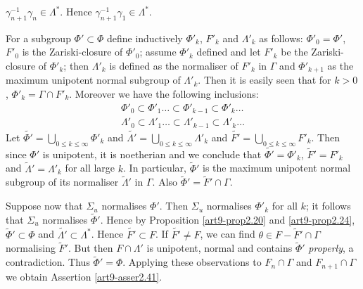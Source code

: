 \setcounter{definition}{40}
\begin{assertion}\label{art9-asser2.41}
$\gamma^{-1}_{n+1} \gamma_n \in \Lambda^\ast$. Hence $\gamma^{-1}_{n+1} \gamma_1 \in \Lambda^\ast$.
\end{assertion}

For a subgroup $\Phi' \subset \Phi$ define inductively $\Phi'_k$, $F'_k$ and $\Lambda'_k$ as follows: $\Phi'_0 = \Phi'$, $F'_0$ is the Zariski-closure of $\Phi'_0$; assume $\Phi'_k$ defined and let $F'_k$ be the Zariski-closure of $\Phi'_k$; then $\Lambda'_k$ is defined as the normaliser of $F'_k$ in $\Gamma$ and $\Phi'_{k+1}$ as the maximum unipotent normal subgroup of $\Lambda'_k$. Then it is easily seen that for $k > 0$, $\Phi'_k = \Gamma \cap F'_k$. Moreover we have the following inclusions:
\begin{align*}
\Phi'_0 \subset \Phi'_1 \ldots \subset \Phi'_{k-1} \subset \Phi'_k\ldots\\
\Lambda'_0 \subset \Lambda'_1 \ldots \subset \Lambda'_{k-1} \subset \Lambda'_k\ldots 
\end{align*}
Let $\tilde{\Phi'} = \bigcup\limits_{0 \leqslant k \leqslant \infty} \Phi'_k$ and $\tilde{\Lambda'} = \bigcup\limits_{0 \leqslant k \leqslant \infty} \Lambda'_k$ and $\tilde{F'} = \bigcup\limits_{0 \leqslant k \leqslant \infty} F'_k$. Then since $\Phi'$ is unipotent, it is noetherian and we conclude that $\tilde{\Phi'} = \Phi'_k$, $\tilde{F}' = F'_k$ and $\tilde{\Lambda}' = \Lambda'_k$ for all large $k$. In particular, $\tilde{\Phi}'$ is the maximum unipotent normal subgroup of its normaliser $\tilde{\Lambda}'$ in $\Gamma$. Also $\tilde{\Phi}' = \tilde{F}' \cap \Gamma$.

Suppose now that $\Sigma_u$ normalises $\Phi'$. Then $\Sigma_u$ normalises $\Phi'_k$ for all $k$; it follows that $\Sigma_u$ normalises $\tilde{\Phi}'$. Hence by Proposition \ref{art9-prop2.20} and \ref{art9-prop2.24}, $\tilde{\Phi}' \subset \Phi$ and $\tilde{\Lambda'} \subset \Lambda^\ast$. Hence $\tilde{F'} \subset F$. If $\tilde{F'} \neq F$, we can find $\theta \in F-\tilde{F}' \cap \Gamma$ normalising $\tilde{F}'$. But then $F \cap \Lambda'$ is unipotent, normal and contains $\tilde{\Phi}'$ \textit{properly}, a contradiction. Thus $\tilde{\Phi}' = \Phi$. Applying these observations to $F_n \cap \Gamma$ and $F_{n+1} \cap \Gamma$ we obtain Assertion \ref{art9-asser2.41}.

\setcounter{subsection}{41}
